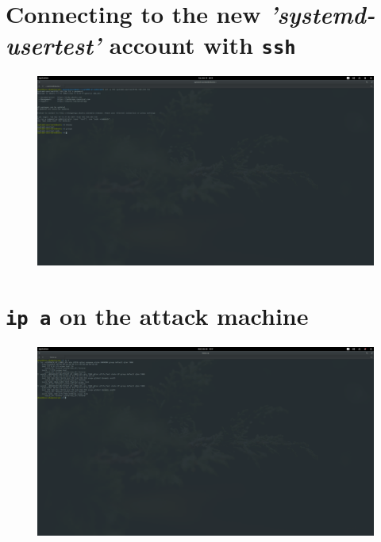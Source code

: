\documentclass[12pt]{report}
\begin{document}
\section{Connecting to the new \textit{'systemd-usertest'} account with \texttt{ssh}}
\label{app:screenshots:4}
\begin{figure}[H]
  \centering
  \includegraphics[width=0.7\paperheight, angle=-90]{It's_Elementary_my_dear_Watson!-2017-12-19-20-19-08}
\end{figure}
\section{\texttt{ip a} on the attack machine}
\label{app:screenshots:5}
\begin{figure}[H]
  \centering
  \includegraphics[width=0.7\paperheight, angle=-90]{It's_Elementary_my_dear_Watson!-2017-12-20-16-17-08}
\end{figure}
\end{document}
